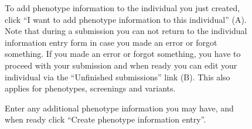 \begin{figure}[ht]
  \begin{shaded}
	  \caption{To add phenotype information to the individual you just created, click ``I want to add phenotype
	   information to this individual'' (A).\newline
	   Note that during a submission you can not return to the individual information entry form in case you made an
	    error or forgot something. 
	   If you made an error or forgot something, you have to proceed with your submission and when ready you can edit
	    your individual via the ``Unfinished submissions'' link (B). 
	   This also applies for phenotypes, screenings and variants.}
		\label{fig:submission_IV}
  \end{shaded}
\end{figure}

\begin{figure}[ht]
  \begin{shaded}
	  \caption{Enter any additional phenotype information you may have, and when ready click ``Create phenotype information entry''.}
		\label{fig:submission_V}
  \end{shaded}
\end{figure}

